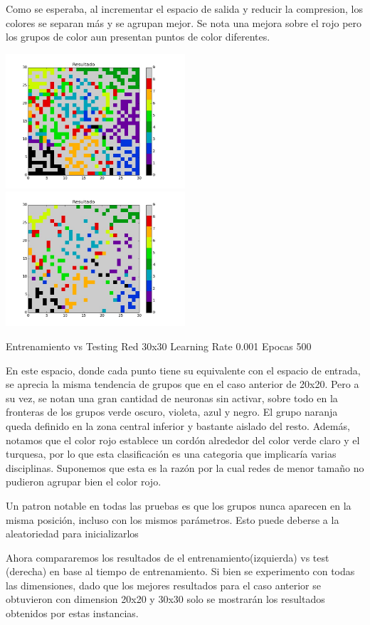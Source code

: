 Como se esperaba, al incrementar el espacio de salida y reducir la compresion, los colores se separan m\'as y se agrupan mejor. Se nota una mejora sobre el rojo pero los grupos de color aun presentan puntos de color diferentes.

\includegraphics[width=0.5\textwidth]{img/ej2_train_M_30_lrate_001_epocas_500}
\includegraphics[width=0.5\textwidth]{img/ej2_test_M_30_lrate_001_epocas_500}
{\footnotesize Entrenamiento vs Testing Red 30x30 Learning Rate 0.001 Epocas 500\par}

En este espacio, donde cada punto tiene su equivalente con el espacio de entrada, se aprecia la misma tendencia de grupos que en el caso anterior de 20x20. Pero a su vez, se notan una gran cantidad de neuronas sin activar, sobre todo en la fronteras de los grupos verde oscuro, violeta, azul y negro. El grupo naranja queda definido en la zona central inferior y bastante aislado del resto. Adem\'as, notamos que el color rojo establece un cord\'on alrededor del color verde claro y el turquesa, por lo que esta clasificaci\'on es una categoria que implicar\'ia varias disciplinas. Suponemos que esta es la raz\'on por la cual redes de menor tama\~no no pudieron agrupar bien el color rojo.

Un patron notable en todas las pruebas es que los grupos nunca aparecen en la misma posici\'on, incluso con los mismos par\'ametros. Esto puede deberse a la aleatoriedad para inicializarlos

Ahora compararemos los resultados de el entrenamiento(izquierda) vs test (derecha) en base al tiempo de entrenamiento. Si bien se experimento con todas las dimensiones, dado que los mejores resultados para el caso anterior se obtuvieron con dimension 20x20 y 30x30 solo se mostrar\'an los resultados obtenidos por estas instancias.


